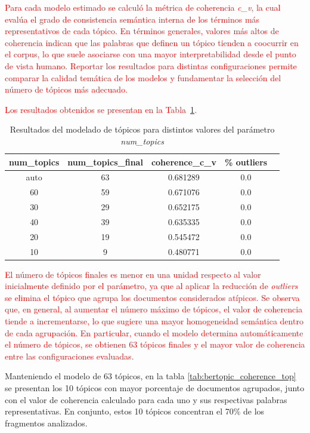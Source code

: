 \documentclass[11pt,a4paper]{article}
\begin{document}
\textcolor{red}{Para cada modelo estimado se calculó la métrica de coherencia \textit{c\_v}, la cual evalúa el grado de consistencia semántica interna de los términos más representativos de cada tópico. En términos generales, valores más altos de coherencia indican que las palabras que definen un tópico tienden a coocurrir en el corpus, lo que suele asociarse con una mayor interpretabilidad desde el punto de vista humano. Reportar los resultados para distintas configuraciones permite comparar la calidad temática de los modelos y fundamentar la selección del número de tópicos más adecuado.}

\textcolor{red}{Los resultados obtenidos se presentan en la Tabla~\ref{tab:coherence_topics}.}

\begin{table}[H]
	\centering
	\begin{tabular}{ccccc}
		\hline
		\textbf{num\_topics} & \textbf{num\_topics\_final} & \textbf{coherence\_c\_v} & \textbf{\% outliers} \\
		\hline
		auto & 63 & 0.681289 & 0.0 \\
		60   & 59 & 0.671076 & 0.0 \\
		30   & 29 & 0.652175 & 0.0 \\
		40   & 39 & 0.635335 & 0.0 \\
		20   & 19 & 0.545472 & 0.0 \\
		10   & 9  & 0.480771 & 0.0 \\
		\hline
	\end{tabular}
	\caption{Resultados del modelado de tópicos para distintos valores del parámetro \textit{num\_topics}}
	\label{tab:coherence_topics}
\end{table}

\textcolor{red}{El número de tópicos finales es menor en una unidad respecto al valor inicialmente definido por el parámetro, ya que al aplicar la reducción de \emph{outliers} se elimina el tópico que agrupa los documentos considerados atípicos. Se observa que, en general, al aumentar el número máximo de tópicos, el valor de coherencia tiende a incrementarse, lo que sugiere una mayor homogeneidad semántica dentro de cada agrupación. En particular, cuando el modelo determina automáticamente el número de tópicos, se obtienen 63 tópicos finales y el mayor valor de coherencia entre las configuraciones evaluadas.}

		
		Manteniendo el modelo de 63 tópicos, en la tabla \ref{tab:bertopic_coherence_top} se presentan los 10 tópicos con mayor porcentaje de documentos agrupados, junto con el valor de coherencia calculado para cada uno y sus respectivas palabras representativas. En conjunto, estos 10 tópicos concentran el 70\% de los fragmentos analizados.
		
\end{document}

